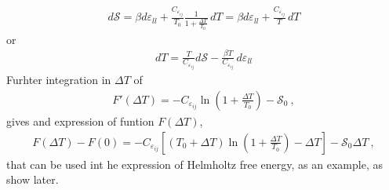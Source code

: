 \documentclass[letterpaper,10pt,english]{jupyterBook}
\begin{document}
\begin{equation*}
\begin{split}d \mathcal{S}
 = \beta d \varepsilon_{ll} + \frac{C_{\varepsilon_{ij}}}{T_0} \frac{1}{1 + \frac{\Delta T}{T_0}} \, d T  
 = \beta d \varepsilon_{ll} + \frac{C_{\varepsilon_{ij}}}{T}\, d T  
\end{split}
\end{equation*}
\sphinxAtStartPar
or
\begin{equation*}
\begin{split}dT = \frac{T}{C_{\varepsilon_{ij}}} d \mathcal{S} - \frac{\beta T}{C_{\varepsilon_{ij}}} \, d \varepsilon_{ll}\end{split}
\end{equation*}
\sphinxAtStartPar
Furhter integration in \(\Delta T\) of
\begin{equation*}
\begin{split}F'(\Delta T) = - C_{\varepsilon_{ij}} \ln \left( 1 + \frac{\Delta T}{T_0} \right) - \mathcal{S}_0 \ ,\end{split}
\end{equation*}
\sphinxAtStartPar
gives and expression of funtion \(F(\Delta T)\),
\begin{equation*}
\begin{split}F(\Delta T) - F(0) = -C_{\varepsilon_{ij}} \left[ (T_0 + \Delta T) \ln \left( 1 + \frac{\Delta T}{T_0} \right) - \Delta T \right] - \mathcal{S}_0 \Delta T \ ,\end{split}
\end{equation*}
\sphinxAtStartPar
that can be used int he expression of Helmholtz free energy, as an example, as show later.
\end{document}
